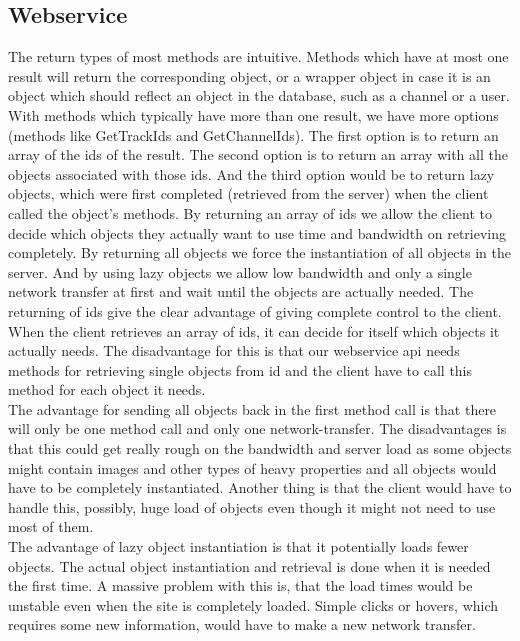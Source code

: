 \documentclass[a4paper,11pt,report]{article}
\begin{document}
\subsection{Webservice}
The return types of most methods are intuitive. Methods which have at most one result will return the corresponding object, or a wrapper object in case it is an object which should reflect an object in the database, such as a channel or a user. \\
With methods which typically have more than one result, we have more options (methods like GetTrackIds and GetChannelIds). 
The first option is to return an array of the ids of the result. The second option is to return an array with all the objects associated with those ids. And the third option would be to return lazy objects, which were first completed (retrieved from the server) when the client called the object's methods. By returning an array of ids we allow the client to decide which objects they actually want to use time and bandwidth on retrieving completely. By returning all objects we force the instantiation of all objects in the server. And by using lazy objects we allow low bandwidth and only a single network transfer at first and wait until the objects are actually needed.
The returning of ids give the clear advantage of giving complete control to the client. When the client retrieves an array of ids, it can decide for itself which objects it actually needs. The disadvantage for this is that our webservice api needs methods for retrieving single objects from id and the client have to call this method for each object it needs. \\
The advantage for sending all objects back in the first method call is that there will only be one method call and only one network-transfer. The disadvantages is that this could get really rough on the bandwidth and server load as some objects might contain images and other types of heavy properties and all objects would have to be completely instantiated. Another thing is that the client would have to handle this, possibly, huge load of objects even though it might not need to use most of them. \\
The advantage of lazy object instantiation is that it potentially loads fewer objects. The actual object instantiation and retrieval is done when it is needed the first time. A massive problem with this is, that the load times would be unstable even when the site is completely loaded. Simple clicks or hovers, which requires some new information, would have to make a new network transfer. \\
\end{document}
